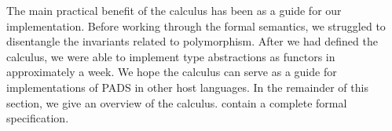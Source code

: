 The main practical benefit of the calculus has been as a guide for our
implementation. Before working through the formal semantics, we
struggled to disentangle the invariants related to polymorphism. After
we had defined the calculus, we were able to implement type
abstractions as \ocaml{} functors in approximately a week.  We hope
the calculus can serve as a guide for implementations of {\sc PADS} in
other host languages.
In the remainder of this section, we give an overview of the calculus.
 contain a complete formal specification.





